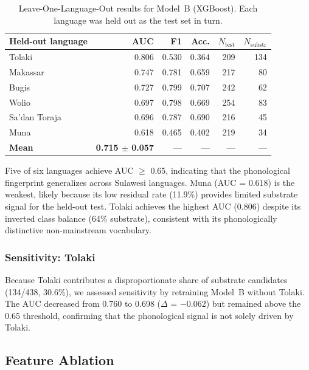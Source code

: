 \documentclass[12pt]{article}
\begin{document}
\begin{table}[H]
\centering
\caption{Leave-One-Language-Out results for Model~B (XGBoost). Each language was held out as the test set in turn.}
\label{tab:lolo}
\begin{tabular}{lrrrrr}
\toprule
Held-out language & AUC & F1 & Acc. & $N_\mathrm{test}$ & $N_\mathrm{substr}$ \\
\midrule
Tolaki       & 0.806 & 0.530 & 0.364 & 209 & 134 \\
Makassar     & 0.747 & 0.781 & 0.659 & 217 &  80 \\
Bugis        & 0.727 & 0.799 & 0.707 & 242 &  62 \\
Wolio        & 0.697 & 0.798 & 0.669 & 254 &  83 \\
Sa'dan Toraja & 0.696 & 0.787 & 0.690 & 216 &  45 \\
Muna         & 0.618 & 0.465 & 0.402 & 219 &  34 \\
\midrule
\textbf{Mean} & \textbf{0.715 $\pm$ 0.057} & --- & --- & --- & --- \\
\bottomrule
\end{tabular}
\end{table}

Five of six languages achieve AUC $\geq$ 0.65, indicating that the phonological fingerprint generalizes across Sulawesi languages.
Muna (AUC = 0.618) is the weakest, likely because its low residual rate (11.9\%) provides limited substrate signal for the held-out test.
Tolaki achieves the highest AUC (0.806) despite its inverted class balance (64\% substrate), consistent with its phonologically distinctive non-mainstream vocabulary.

\subsubsection{Sensitivity: Tolaki}

Because Tolaki contributes a disproportionate share of substrate candidates (134/438, 30.6\%), we assessed sensitivity by retraining Model~B without Tolaki.
The AUC decreased from 0.760 to 0.698 ($\Delta$ = $-$0.062) but remained above the 0.65 threshold, confirming that the phonological signal is not solely driven by Tolaki.

\subsection{Feature Ablation}
\label{sec:results_ablation}
\end{document}
